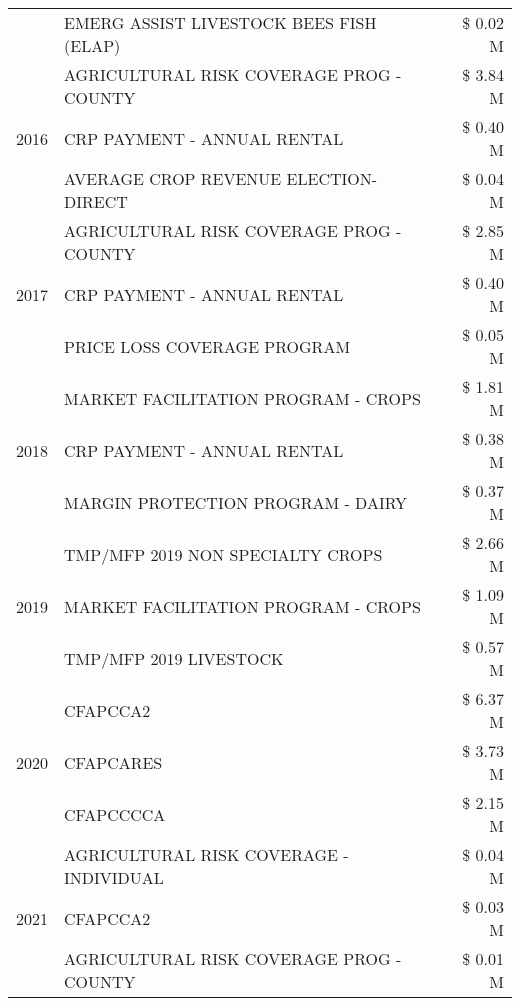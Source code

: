 \begin{tabular}{llr}
 & EMERG ASSIST LIVESTOCK BEES FISH (ELAP) & \$ 0.02 M \\
\cline{1-3}
\multirow[t]{3}{*}{2016} & AGRICULTURAL RISK COVERAGE PROG - COUNTY & \$ 3.84 M \\
 & CRP PAYMENT - ANNUAL RENTAL & \$ 0.40 M \\
 & AVERAGE CROP REVENUE ELECTION-DIRECT & \$ 0.04 M \\
\cline{1-3}
\multirow[t]{3}{*}{2017} & AGRICULTURAL RISK COVERAGE PROG - COUNTY & \$ 2.85 M \\
 & CRP PAYMENT - ANNUAL RENTAL & \$ 0.40 M \\
 & PRICE LOSS COVERAGE PROGRAM & \$ 0.05 M \\
\cline{1-3}
\multirow[t]{3}{*}{2018} & MARKET FACILITATION PROGRAM - CROPS & \$ 1.81 M \\
 & CRP PAYMENT - ANNUAL RENTAL & \$ 0.38 M \\
 & MARGIN PROTECTION PROGRAM - DAIRY & \$ 0.37 M \\
\cline{1-3}
\multirow[t]{3}{*}{2019} & TMP/MFP 2019 NON SPECIALTY CROPS & \$ 2.66 M \\
 & MARKET FACILITATION PROGRAM - CROPS & \$ 1.09 M \\
 & TMP/MFP 2019 LIVESTOCK & \$ 0.57 M \\
\cline{1-3}
\multirow[t]{3}{*}{2020} & CFAPCCA2 & \$ 6.37 M \\
 & CFAPCARES & \$ 3.73 M \\
 & CFAPCCCCA & \$ 2.15 M \\
\cline{1-3}
\multirow[t]{3}{*}{2021} & AGRICULTURAL RISK COVERAGE - INDIVIDUAL & \$ 0.04 M \\
 & CFAPCCA2 & \$ 0.03 M \\
 & AGRICULTURAL RISK COVERAGE PROG - COUNTY & \$ 0.01 M \\
\cline{1-3}
\bottomrule
\end{tabular}
